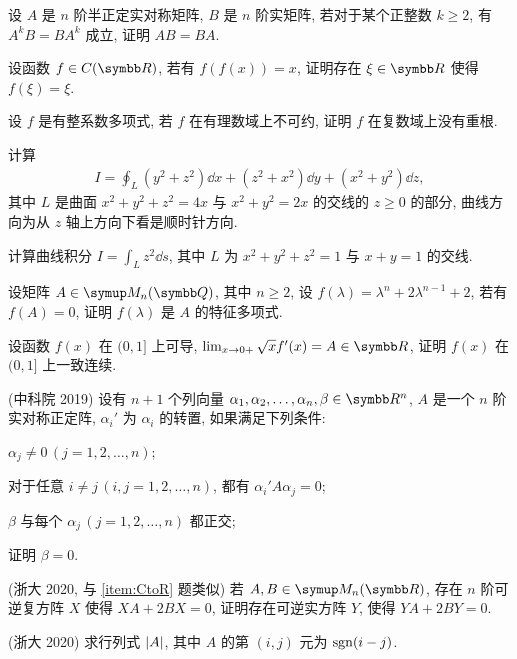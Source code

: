 \begin{exercise}[resume=exer]
\begin{answer}
        \end{answer}
        \item 设 $ A $ 是 $ n $ 阶半正定实对称矩阵, $ B $ 是 $ n $ 阶实矩阵, 若对于某个正整数 $ k \ge 2 $, 有 $ A^{k}B = BA^{k} $ 成立, 证明 $ AB = BA $. 
        \item 设函数 $ f \in C(\R) $, 若有 $ f(f(x)) = x $, 证明存在 $ \xi\in \R $ 使得 $ f(\xi) = \xi $.
        \item 设 $ f $ 是有整系数多项式, 若 $ f $ 在有理数域上不可约, 证明 $ f $ 在复数域上没有重根. 
        \item 计算 
        \begin{align*}
            I = \oint_{L} (y^{2} + z^{2}) \dd{x} + (z^{2} + x^{2}) \dd{y} + (x^{2} + y^{2}) \dd{z},
        \end{align*}
        其中 $ L $ 是曲面 $ x^{2} + y^{2} + z^{2} = 4x $ 与 $ x^{2} + y^{2} = 2x $ 的交线的 $ z \ge 0 $ 的部分, 曲线方向为从 $ z $ 轴上方向下看是顺时针方向.
        \item 计算曲线积分 $ I = \int_{L} z^{2} \dd{s} $, 其中 $ L $ 为 $ x^{2} + y^{2} + z^{2} = 1 $ 与 $ x + y = 1 $ 的交线.
        \item 设矩阵 $ A \in \MM[\Q] $, 其中 $ n\ge 2 $, 设 $ f(\lambda) = \lambda^{n} + 2\lambda^{n-1} + 2 $, 若有 $ f(A) = 0 $, 证明 $ f(\lambda) $ 是 $ A $ 的特征多项式.
        \item 设函数 $ f(x) $ 在 $ (0, 1] $ 上可导, $ \limit{x}{0+} \sqrt{x}f'(x) = A\in \R $, 证明 $ f(x) $ 在 $ (0, 1] $ 上一致连续.
        \item (中科院 2019) 设有 $ n + 1 $ 个列向量 $ \alpha_{1}, \alpha_{2}, \dots, \alpha_{n}, \beta \in \R^{n} $, $ A $ 是一个 $ n $ 阶实对称正定阵, $ \alpha_{i}' $ 为 $ \alpha_{i} $ 的转置, 如果满足下列条件: 
        \begin{exercise}
            \item $ \alpha_{j} \ne 0\, (j = 1, 2, \dots, n) $;
            \item 对于任意 $ i \ne j \,(i, j = 1, 2, \dots, n) $, 都有 $ \alpha_{i}' A \alpha_{j} = 0 $;
            \item $ \beta $ 与每个 $ \alpha_{j}\,(j = 1, 2, \dots, n) $ 都正交; 
        \end{exercise}
        证明 $ \beta = 0 $.
        \item (浙大 2020, 与 \ref{item:CtoR} 题类似) 若 $ A, B \in \MM $, 存在 $ n $ 阶可逆复方阵 $ X $ 使得 $ XA + 2BX = 0 $, 证明存在可逆实方阵 $ Y $, 使得 $ YA + 2BY = 0 $. 
        \item (浙大 2020) 求行列式 $ \abs{A} $, 其中 $ A $ 的第 $ (i, j) $ 元为 $ \operatorname{sgn}(i - j) $.

\end{exercise}
